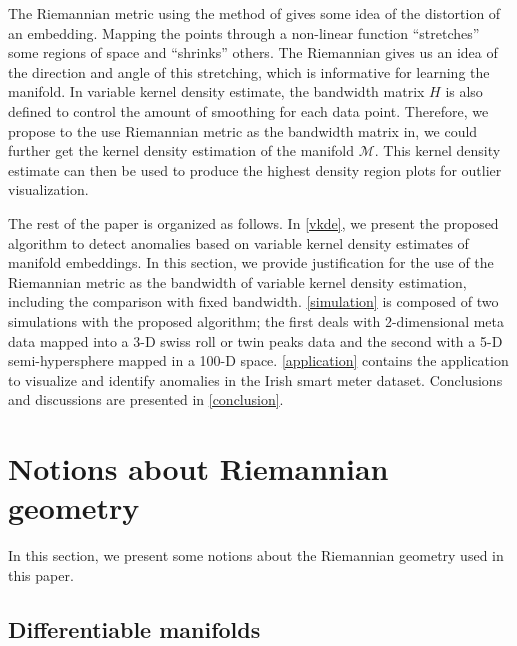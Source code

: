 \documentclass[11pt,a4paper,]{article}
\begin{document}
The Riemannian metric using the method of \textcite{Perrault-Joncas2013-pq} gives some idea of the distortion of an embedding. Mapping the points through a non-linear function ``stretches'' some regions of space and ``shrinks'' others. The Riemannian gives us an idea of the direction and angle of this stretching, which is informative for learning the manifold.
In variable kernel density estimate, the bandwidth matrix \(H\) is also defined to control the amount of smoothing for each data point.
Therefore, we propose to the use Riemannian metric as the bandwidth matrix in, we could further get the kernel density estimation of the manifold \(\mathcal{M}\). This kernel density estimate can then be used to produce the highest density region plots \autocite{Hyndman1996-lk} for outlier visualization.

The rest of the paper is organized as follows.
In \autoref{vkde}, we present the proposed algorithm to detect anomalies based on variable kernel density estimates of manifold embeddings. In this section, we provide justification for the use of the Riemannian metric as the bandwidth of variable kernel density estimation, including the comparison with fixed bandwidth.
\autoref{simulation} is composed of two simulations with the proposed algorithm; the first deals with 2-dimensional meta data mapped into a 3-D swiss roll or twin peaks data and the second with a 5-D semi-hypersphere mapped in a 100-D space.
\autoref{application} contains the application to visualize and identify anomalies in the Irish smart meter dataset.
Conclusions and discussions are presented in \autoref{conclusion}.

\hypertarget{riemgeo}{%
\section{Notions about Riemannian geometry}\label{riemgeo}}

In this section, we present some notions about the Riemannian geometry used in this paper.

\hypertarget{differentiable-manifolds}{%
\subsection{Differentiable manifolds}\label{differentiable-manifolds}}
\end{document}

